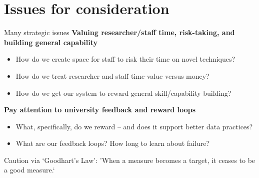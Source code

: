 \documentclass[aspectratio=1610, 11pt]{beamer} %
\begin{document}







\section{Issues for consideration}
\begin{frame}{Many strategic issues}
\textbf{Valuing researcher/staff time,  risk-taking, and building general capability}
\begin{itemize}
    \item How do we create space for staff to risk their time on novel techniques?
    \item How do we treat researcher and staff time-value versus money?
    \item How do we get our system to reward general skill/capability building?
\end{itemize}
    
\textbf{Pay attention to university feedback and reward loops}    
    \begin{itemize}
    \item What, specifically, do we reward -- and does it support better data practices?
    \item What are our feedback loops? How long to learn about failure?
\end{itemize}


Caution via `Goodhart's Law': 'When a measure becomes a target, it ceases to be a good measure.` \parencite{Strathern1997-du, Goodhart1975-cq}

\end{frame}
\end{document}
